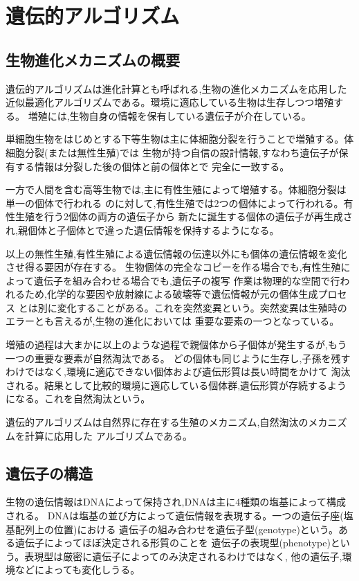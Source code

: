 \section{遺伝的アルゴリズム}
\subsection{生物進化メカニズムの概要}

遺伝的アルゴリズムは進化計算とも呼ばれる,生物の進化メカニズムを応用した
近似最適化アルゴリズムである。環境に適応している生物は生存しつつ増殖する。
増殖には,生物自身の情報を保有している遺伝子が介在している。

単細胞生物をはじめとする下等生物は主に体細胞分裂を行うことで増殖する。体細胞分裂(または無性生殖)では
生物が持つ自信の設計情報,すなわち遺伝子が保有する情報は分裂した後の個体と前の個体とで
完全に一致する。

一方で人間を含む高等生物では,主に有性生殖によって増殖する。体細胞分裂は単一の個体で行われる
のに対して,有性生殖では2つの個体によって行われる。有性生殖を行う2個体の両方の遺伝子から
新たに誕生する個体の遺伝子が再生成され,親個体と子個体とで違った遺伝情報を保持するようになる。

以上の無性生殖,有性生殖による遺伝情報の伝達以外にも個体の遺伝情報を変化させ得る要因が存在する。
生物個体の完全なコピーを作る場合でも,有性生殖によって遺伝子を組み合わせる場合でも,遺伝子の複写
作業は物理的な空間で行われるため,化学的な要因や放射線による破壊等で遺伝情報が元の個体生成プロセス
とは別に変化することがある。これを突然変異という。突然変異は生殖時のエラーとも言えるが,生物の進化においては
重要な要素の一つとなっている。

増殖の過程は大まかに以上のような過程で親個体から子個体が発生するが,もう一つの重要な要素が自然淘汰である。
どの個体も同じように生存し,子孫を残すわけではなく,環境に適応できない個体および遺伝形質は長い時間をかけて
淘汰される。結果として比較的環境に適応している個体群,遺伝形質が存続するようになる。これを自然淘汰という。

遺伝的アルゴリズムは自然界に存在する生殖のメカニズム,自然淘汰のメカニズムを計算に応用した
アルゴリズムである。

\subsection{遺伝子の構造}
生物の遺伝情報はDNAによって保持され,DNAは主に4種類の塩基によって構成される。
DNAは塩基の並び方によって遺伝情報を表現する。一つの遺伝子座(塩基配列上の位置)における
遺伝子の組み合わせを遺伝子型(genotype)という。ある遺伝子によってほぼ決定される形質のことを
遺伝子の表現型(phenotype)という。表現型は厳密に遺伝子によってのみ決定されるわけではなく,
他の遺伝子,環境などによっても変化しうる。


